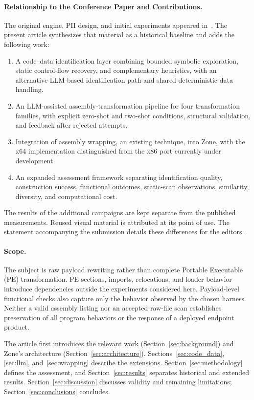 \paragraph{Relationship to the Conference Paper and Contributions.}
The original engine, PII design, and initial experiments appeared
in~\cite{zone_secrypt_2026}. The present article synthesizes that material
as a historical baseline and adds the following work:
\begin{enumerate}
\item A code--data identification layer combining bounded symbolic
exploration, static control-flow recovery, and complementary heuristics,
with an alternative LLM-based identification path and shared deterministic
data handling.
\item An LLM-assisted assembly-transformation pipeline for four
transformation families, with explicit zero-shot and two-shot conditions,
structural validation, and feedback after rejected attempts.
\item Integration of assembly wrapping, an existing technique, into Zone,
with the x64 implementation distinguished from the x86 port currently
under development.
\item An expanded assessment framework separating identification quality,
construction success, functional outcomes, static-scan observations,
similarity, diversity, and computational cost.
\end{enumerate}
The results of the additional campaigns are kept separate from the
published measurements. Reused visual material is attributed at its
point of use. The statement accompanying the submission details these
differences for the editors.

\paragraph{Scope.}
The subject is raw payload rewriting rather than complete Portable
Executable (PE) transformation. PE sections, imports, relocations, and
loader behavior introduce dependencies outside the experiments considered
here. Payload-level functional checks also capture only the behavior
observed by the chosen harness. Neither a valid assembly listing nor an
accepted raw-file scan establishes preservation of all program behaviors
or the response of a deployed endpoint product.

The article first introduces the relevant work
(Section~\ref{sec:background}) and Zone's architecture
(Section~\ref{sec:architecture}). Sections~\ref{sec:code_data},
\ref{sec:llm}, and~\ref{sec:wrapping} describe the extensions.
Section~\ref{sec:methodology} defines the assessment, and
Section~\ref{sec:results} separates historical and extended results.
Section~\ref{sec:discussion} discusses validity and remaining limitations;
Section~\ref{sec:conclusions} concludes.
